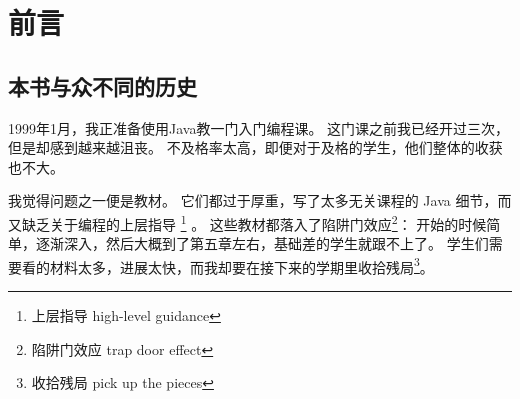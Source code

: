 

\chapter{前言}

\section*{本书与众不同的历史}


1999年1月，我正准备使用Java教一门入门编程课。
这门课之前我已经开过三次， 但是却感到越来越沮丧。 不及格率太高，即便对于及格的学生，他们整体的收获也不大。


我觉得问题之一便是教材。
它们都过于厚重，写了太多无关课程的 Java 细节，而又缺乏关于编程的上层指导 \footnote{上层指导 high-level guidance} 。
这些教材都落入了陷阱门效应\footnote {陷阱门效应 trap door effect}： 开始的时候简单，逐渐深入，然后大概到了第五章左右，基础差的学生就跟不上了。
学生们需要看的材料太多，进展太快，而我却要在接下来的学期里收拾残局\footnote{收拾残局 pick up the pieces}。



